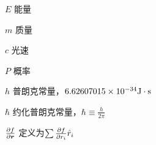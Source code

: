 \begin{denotation}[3cm]
  \item[$E$] 能量
  \item[$m$] 质量
  \item[$c$] 光速
  \item[$P$] 概率
  \item[$h$] 普朗克常量，$6.62607015 \times 10^{-34}  \mathrm{J \cdot s}$
  \item[$\hbar$] 约化普朗克常量，$\hbar \equiv \frac{h}{2\pi}$
  \item[$\frac{\partial f}{\partial \bm{r}}$] 定义为$\sum \frac{\partial f}{\partial r_i} \hat{r}_i$ 

\end{denotation}
